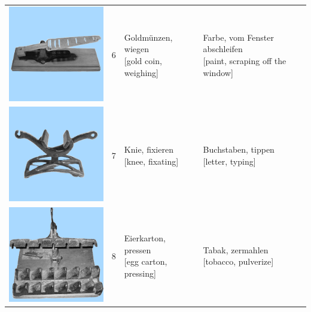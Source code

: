 \documentclass[
  english,
  man,floatsintext]{apa7}
\begin{document}
\begin{center}
\begin{ThreePartTable}
{\begin{longtable}{llll}
\includegraphics[valign=c, scale=0.23]{../materials/unfamiliar/6.png} & 6 & \makecell[l]{Goldmünzen, wiegen\\{[gold coin, weighing]}} & \makecell[l]{Farbe, vom Fenster abschleifen\\{[paint, scraping off the window]}}\\
\includegraphics[valign=c, scale=0.23]{../materials/unfamiliar/7.png} & 7 & \makecell[l]{Knie, fixieren\\{[knee, fixating]}} & \makecell[l]{Buchstaben, tippen\\{[letter, typing]}}\\
\includegraphics[valign=c, scale=0.23]{../materials/unfamiliar/8.png} & 8 & \makecell[l]{Eierkarton, pressen\\{[egg carton, pressing]}} & \makecell[l]{Tabak, zermahlen\\{[tobacco, pulverize]}}\\

\end{longtable}}
\end{ThreePartTable}
\end{center}
\end{document}

